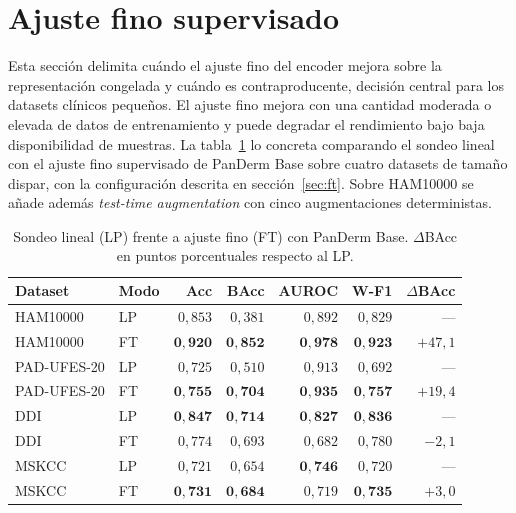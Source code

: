 \section{Ajuste fino supervisado}
\label{sec:ft-results}

Esta sección delimita cuándo el ajuste fino del encoder mejora sobre
la representación congelada y cuándo es contraproducente, decisión
central para los datasets clínicos pequeños. El ajuste fino mejora con
una cantidad moderada o elevada de datos de entrenamiento y puede
degradar el rendimiento bajo baja disponibilidad de muestras. La
tabla~\ref{tab:ft-panderm} lo concreta comparando el
sondeo lineal con el ajuste fino supervisado de PanDerm Base sobre
cuatro datasets de tamaño dispar, con la configuración descrita
en sección~\ref{sec:ft}. Sobre HAM10000 se añade además
\emph{test-time augmentation} con cinco augmentaciones
deterministas.

\begin{table}[H]
\centering
\footnotesize
\setlength{\tabcolsep}{4pt}
\renewcommand{\arraystretch}{0.95}
\caption{Sondeo lineal (LP) frente a ajuste fino (FT) con PanDerm
Base. $\Delta$BAcc en puntos porcentuales respecto al LP.}
\label{tab:ft-panderm}
\begin{tabular}{llrrrrr}
\hline
Dataset      & Modo & Acc           & BAcc          & AUROC         & W-F1          & $\Delta$BAcc \\
\hline
HAM10000     & LP   & $0{,}853$     & $0{,}381$     & $0{,}892$     & $0{,}829$     & --- \\
HAM10000     & FT   & $\mathbf{0{,}920}$ & $\mathbf{0{,}852}$ & $\mathbf{0{,}978}$ & $\mathbf{0{,}923}$ & $+47{,}1$ \\
PAD-UFES-20  & LP   & $0{,}725$     & $0{,}510$     & $0{,}913$     & $0{,}692$     & --- \\
PAD-UFES-20  & FT   & $\mathbf{0{,}755}$ & $\mathbf{0{,}704}$ & $\mathbf{0{,}935}$ & $\mathbf{0{,}757}$ & $+19{,}4$ \\
DDI          & LP   & $\mathbf{0{,}847}$ & $\mathbf{0{,}714}$ & $\mathbf{0{,}827}$ & $\mathbf{0{,}836}$ & --- \\
DDI          & FT   & $0{,}774$     & $0{,}693$     & $0{,}682$     & $0{,}780$     & $-2{,}1$ \\
MSKCC        & LP   & $0{,}721$     & $0{,}654$     & $\mathbf{0{,}746}$ & $0{,}720$     & --- \\
MSKCC        & FT   & $\mathbf{0{,}731}$ & $\mathbf{0{,}684}$ & $0{,}719$     & $\mathbf{0{,}735}$ & $+3{,}0$ \\
\hline
\end{tabular}
\end{table}

